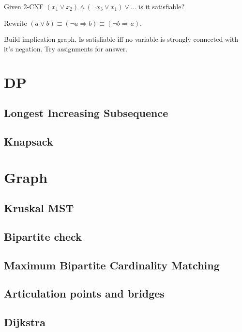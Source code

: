 \documentclass[a4paper,landscape,8pt]{article}
\begin{document}
\begin{multicols}{2}
Given 2-CNF $(x_1 \lor x_2) \land (\lnot x_3 \lor x_1) \lor ...$ is it satisfiable?

Rewrite $(a \lor b) \equiv (\lnot a \Rightarrow b) \equiv (\lnot b \Rightarrow a)$.

Build implication graph. Is satisfiable iff no variable is strongly connected with it's negation.  Try assignments for answer.

\section{DP}

\subsection{Longest Increasing Subsequence}


\subsection{Knapsack}



\section{Graph}

\subsection{Kruskal MST}


\subsection{Bipartite check}


\subsection{Maximum Bipartite Cardinality Matching}


\subsection{Articulation points and bridges}


\subsection{Dijkstra}



\end{multicols}
\end{document}
